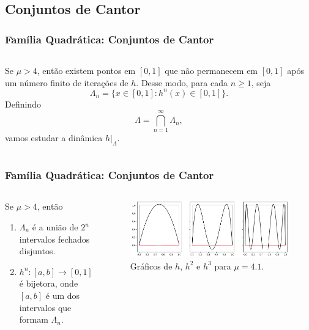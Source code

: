 \subsection{Conjuntos de Cantor}

\begin{frame}
\vspace{5pt}
\frametitle{Família Quadrática: Conjuntos de Cantor}
\begin{columns}
\column{\dimexpr\paperwidth-15pt}

Se $\mu > 4$, então existem pontos em $[0, 1]$ que não permanecem em $[0, 1]$ após um número finito de iterações de $h$. Desse modo, para cada $n \geq 1$, seja
$$\Lambda_n = \lbrace x \in [0, 1] : h^n(x) \in [0, 1] \rbrace.$$ 
Definindo
$$\Lambda =  \bigcap_{n = 1}^\infty \Lambda_n,$$
vamos estudar a dinâmica $h|_\Lambda$.

\end{columns}
\end{frame}


\begin{frame}
\frametitle{Família Quadrática: Conjuntos de Cantor}
\begin{columns}
\column{\dimexpr\paperwidth-15pt}

\begin{proposition}
Se $\mu > 4$, então
\begin{enumerate}
\item $\Lambda_n$ é a união de $2^n$ intervalos fechados disjuntos.
\item $h^n: [a, b] \to [0, 1]$ é bijetora, onde $[a, b]$ é um dos intervalos que formam $\Lambda_n$.
\end{enumerate}
\end{proposition}

\begin{figure}[!htb]
\centering
\includegraphics[scale=0.4]{images/h_4,1.png}
\caption{Gráficos de $h$, $h^2$ e $h^3$ para $\mu = 4.1$.}
\label{h_3,839}
\end{figure}

\end{columns}
\end{frame}

